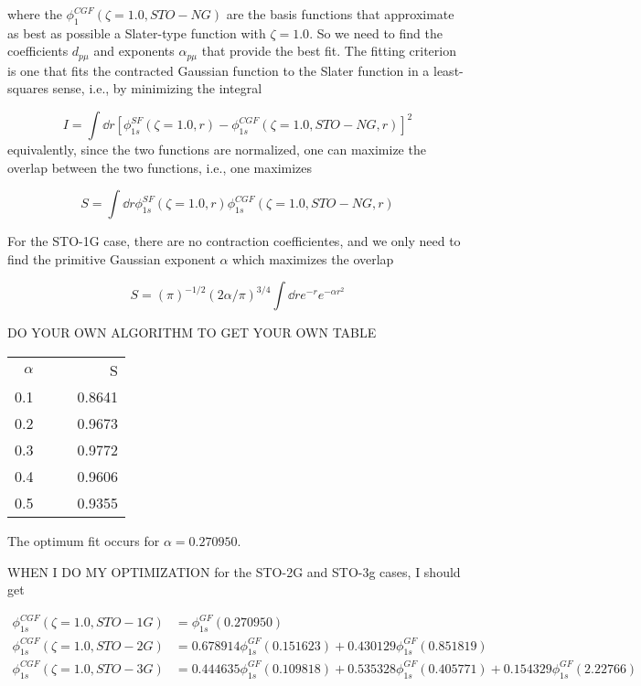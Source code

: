 \documentclass[11pt]{article}
\begin{document}
where the \(\phi_1^{CGF} (\zeta = 1.0,STO-NG)\) are the basis functions that approximate as best as possible a Slater-type function with \(\zeta = 1.0\). So we need to find the coefficients \(d_{p\mu}\) and exponents \(\alpha_{p\mu}\) that provide the best fit. The fitting criterion is one that fits the contracted Gaussian function to the Slater function in a least-squares sense, i.e., by minimizing the integral

\[ I = \int \dd{r}[\phi_{1s}^{SF}(\zeta = 1.0,r) - \phi_{1s}^{CGF}(\zeta = 1.0, STO-NG,r)]^2 \]
equivalently, since the two functions are normalized, one can maximize the overlap between the two functions, i.e., one maximizes

\[ S = \int \dd{r}\phi_{1s}^{SF}(\zeta = 1.0,r) \phi_{1s}^{CGF}(\zeta = 1.0, STO-NG,r) \]

For the STO-1G case, there are no contraction coefficientes, and we only need to find the primitive Gaussian exponent \(\alpha\) which maximizes the overlap

\[ S = (\pi)^{-1/2} (2\alpha/\pi)^{3/4} \int \dd{r}e^{-r}e^{-\alpha r^2} \]


DO YOUR OWN ALGORITHM TO GET YOUR OWN TABLE

\begin{center}
\begin{tabular}{rllr}
\hline
\(\alpha\) &  &  & S\\
0.1 &  &  & 0.8641\\
0.2 &  &  & 0.9673\\
0.3 &  &  & 0.9772\\
0.4 &  &  & 0.9606\\
0.5 &  &  & 0.9355\\
\hline
\end{tabular}
\end{center}

The optimum fit occurs for \(\alpha = 0.270950\). 


WHEN I DO MY OPTIMIZATION for the STO-2G and STO-3g cases, I should get

\begin{align*}
    \phi_{1s}^{CGF}(\zeta = 1.0, STO-1G) &= \phi_{1s}^{GF}(0.270950)\\
    \phi_{1s}^{CGF}(\zeta = 1.0, STO-2G) &= 0.678914 \phi_{1s}^{GF}(0.151623) + 0.430129 \phi_{1s}^{GF}(0.851819)\\
    \phi_{1s}^{CGF}(\zeta=1.0, STO-3G) &= 0.444635 \phi_{1s}^{GF}(0.109818) + 0.535328 \phi_{1s}^{GF}(0.405771) + 0.154329\phi_{1s}^{GF}(2.22766)
\end{align*}
\end{document}

